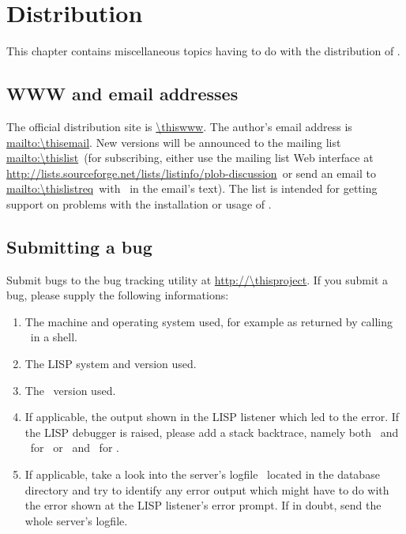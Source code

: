 
\chapter{Distribution}

This chapter contains miscellaneous topics having to do with the
distribution of \plobwoexcl.

{\section{WWW and email addresses}}%
\label{sec:ContactAddress}

The official distribution site is \url{\thiswww}.  The author's email
address is \url{mailto:\thisemail}.  New versions will be announced to
the mailing list \url{mailto:\thislist}\ (for subscribing, either use
the mailing list Web interface at
\url{http://lists.sourceforge.net/lists/listinfo/plob-discussion}\ or
send an email to \url{mailto:\thislistreq}\ with \ in
the email's text). The list is intended for getting support on
problems with the installation or usage of \plobwoexcl.

{\section{Submitting a bug}}%
\label{sec:BugSubmit}

Submit bugs to the bug tracking utility at \url{http://\thisproject}.
If you submit a bug, please supply the following informations:

\begin{enumerate}

\item The machine and operating system used, for example as returned
  by calling \ in a shell.

\item The LISP system and version used.

\item The \plob\ version used.

\item If applicable, the output shown in the LISP listener which led
  to the error. If the LISP debugger is raised, please add a stack
  backtrace, namely both \ and \ for \allegrocl\ 
  or \ and \ for \lwcl.

\item If applicable, take a look into the server's logfile
  \ located in the database directory and try to
  identify any error output which might have to do with the error
  shown at the LISP listener's error prompt. If in doubt, send the
  whole server's logfile.

\end{enumerate}

